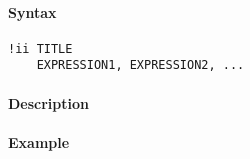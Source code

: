 


	\paragraph{Syntax}\label{syntax}

\begin{verbatim}
!ii TITLE
    EXPRESSION1, EXPRESSION2, ...
\end{verbatim}

\paragraph{Description}\label{description}

\paragraph{Example}\label{example}


